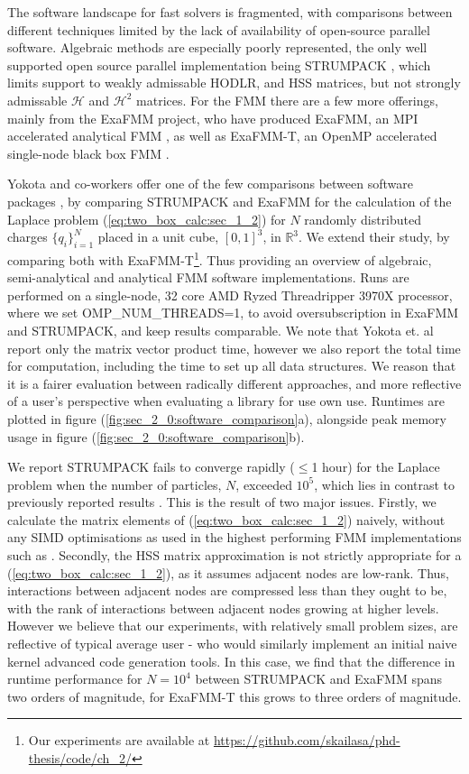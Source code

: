 The software landscape for fast solvers is fragmented, with comparisons between different techniques limited by the lack of availability of open-source parallel software. Algebraic methods are especially poorly represented, the only well supported open source parallel implementation being STRUMPACK \cite{ghyselsstrumpack}, which limits support to weakly admissable HODLR, and HSS matrices, but not strongly admissable $\mathcal{H}$ and $\mathcal{H}^2$ matrices. For the FMM there are a few more offerings, mainly from the ExaFMM project, who have produced ExaFMM, an MPI accelerated analytical FMM \cite{exafmm}, as well as ExaFMM-T, an OpenMP accelerated single-node black box FMM \cite{wang2021exafmm}.

Yokota and co-workers offer one of the few comparisons between software packages \cite{yokota2015fast}, by comparing STRUMPACK and ExaFMM for the calculation of the Laplace problem (\ref{eq:two_box_calc:sec_1_2}) for $N$ randomly distributed charges $\{ q_i\}_{i=1}^N$ placed in a unit cube, $[0, 1]^3$, in $\mathbb{R}^3$. We extend their study, by comparing both with ExaFMM-T\footnote{Our experiments are available at \url{https://github.com/skailasa/phd-thesis/code/ch_2/}}. Thus providing an overview of algebraic, semi-analytical and analytical FMM software implementations. Runs are performed on a single-node, 32 core AMD Ryzed Threadripper 3970X processor, where we set OMP\_NUM\_THREADS=1, to avoid oversubscription in ExaFMM and STRUMPACK, and keep results comparable. We note that Yokota et. al report only the matrix vector product time, however we also report the total time for computation, including the time to set up all data structures. We reason that it is a fairer evaluation between radically different approaches, and more reflective of a user's perspective when evaluating a library for use own use. Runtimes are plotted in figure (\ref{fig:sec_2_0:software_comparison}a), alongside peak memory usage in figure (\ref{fig:sec_2_0:software_comparison}b). 

We report STRUMPACK fails to converge rapidly ($\leq$1 hour) for the Laplace problem when the number of particles, $N$, exceeded $10^5$, which lies in contrast to previously reported results \cite{yokota2015fast}. This is the result of two major issues. Firstly, we calculate the matrix elements of (\ref{eq:two_box_calc:sec_1_2}) naively, without any SIMD optimisations as used in the highest performing FMM implementations such as \cite{wang2021exafmm}. Secondly, the HSS matrix approximation is not strictly appropriate for a (\ref{eq:two_box_calc:sec_1_2}), as it assumes adjacent nodes are low-rank. Thus, interactions between adjacent nodes are compressed less than they ought to be, with the rank of interactions between adjacent nodes growing at higher levels. However we believe that our experiments, with relatively small problem sizes, are reflective of typical average user - who would similarly implement an initial naive kernel advanced code generation tools. In this case, we find that the difference in runtime performance for $N=10^4$ between STRUMPACK and ExaFMM spans two orders of magnitude, for ExaFMM-T this grows to three orders of magnitude. 

